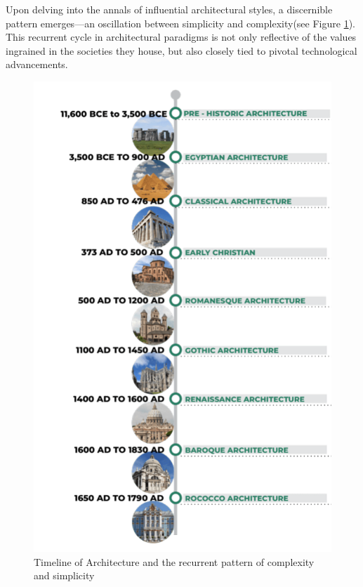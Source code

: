 Upon delving into the annals of influential architectural styles, a discernible pattern emerges—an oscillation between simplicity and complexity(see Figure \ref{fig:TimelineArchitecture}). This recurrent cycle in architectural paradigms is not only reflective of the values ingrained in the societies they house, but also closely tied to pivotal technological advancements.

     \begin{figure}[htb]
          \centering
          \includegraphics[width= \linewidth]{Images/TimelineArchitecture.pdf}
          \caption{Timeline of Architecture and the recurrent pattern of complexity and simplicity}
          \label{fig:TimelineArchitecture}
        \end{figure}

